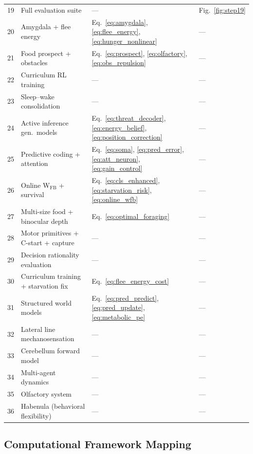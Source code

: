 \documentclass[11pt,a4paper]{article}
\begin{document}
\begin{table}[H]
\begin{tabular}{clll}
19 & Full evaluation suite  & ---                                    & Fig.~\ref{fig:step19} \\
20 & Amygdala + flee energy & Eq.~\ref{eq:amygdala}, \ref{eq:flee_energy}, \ref{eq:hunger_nonlinear} & --- \\
21 & Food prospect + obstacles & Eq.~\ref{eq:prospect}, \ref{eq:olfactory}, \ref{eq:obs_repulsion} & --- \\
22 & Curriculum RL training & ---                                    & --- \\
23 & Sleep--wake consolidation & ---                                 & --- \\
24 & Active inference gen.\ models & Eq.~\ref{eq:threat_decoder}, \ref{eq:energy_belief}, \ref{eq:position_correction} & --- \\
25 & Predictive coding + attention & Eq.~\ref{eq:soma}, \ref{eq:pred_error}, \ref{eq:att_neuron}, \ref{eq:gain_control} & --- \\
26 & Online W$_\text{FB}$ + survival & Eq.~\ref{eq:cls_enhanced}, \ref{eq:starvation_risk}, \ref{eq:online_wfb} & --- \\
27 & Multi-size food + binocular depth & Eq.~\ref{eq:optimal_foraging} & --- \\
28 & Motor primitives + C-start + capture & --- & --- \\
29 & Decision rationality evaluation & --- & --- \\
30 & Curriculum training + starvation fix & Eq.~\ref{eq:flee_energy_cost} & --- \\
31 & Structured world models & Eq.~\ref{eq:pred_predict}, \ref{eq:pred_update}, \ref{eq:metabolic_pe} & --- \\
32 & Lateral line mechanosensation & --- & --- \\
33 & Cerebellum forward model & --- & --- \\
34 & Multi-agent dynamics & --- & --- \\
35 & Olfactory system & --- & --- \\
36 & Habenula (behavioral flexibility) & --- & --- \\
\bottomrule
\end{tabular}
\end{table}

\subsection{Computational Framework Mapping}\label{sec:framework_map}
\end{document}
